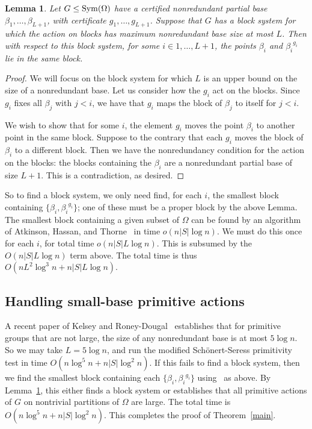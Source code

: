 \documentclass[12pt]{article}
\newcommand{\Sym}{{\rm Sym}}
\newtheorem{lemma}[theorem]{Lemma}
\begin{document}
\begin{lemma}\label{proper block}
  Let $G\leq\Sym(\Omega)$ have
  a certified nonredundant partial base $\beta_1,\ldots,\beta_{L+1}$,
  with certificate $g_1,\ldots,g_{L+1}$.
  Suppose that $G$ has a block system for which the
  action on blocks has maximum nonredundant base size at most $L$.
  Then with respect to this block system,
  for some $i\in 1,\ldots,L+1$, the points $\beta_i$ and
  ${\beta_i}^{g_i}$ lie in the same block.
\end{lemma}
\begin{proof}
  We will focus on the block system for which $L$ is
  an upper bound on the size of a nonredundant base.
  Let us consider how the $g_i$ act on the blocks.
  Since $g_i$ fixes all $\beta_j$ with $j<i$,
  we have that $g_i$ maps the block of $\beta_j$ to itself for $j<i$.

  We wish to show that for some $i$, the element $g_i$ moves the point $\beta_i$ to another point in the
  same block.  Suppose to the contrary that 
  each $g_i$ moves the block of $\beta_i$ to a different block.   Then we have the nonredundancy
  condition for the action on the blocks: the blocks containing
  the $\beta_i$ are a nonredundant partial base of size $L+1$.
  This is a contradiction, as desired.
\end{proof}

So to find a block system, we only need
find, for each $i$, the smallest block
containing $\{\beta_i,{\beta_i}^{g_i}\}$; one of these must
be a proper block by the above Lemma.
The smallest block containing a given subset of $\Omega$
can be found by an algorithm of Atkinson, Hassan, and
Thorne~\cite{atkinson1984group} in time $o(n|S|\log n)$.
We must do this once for each $i$,
for total time $o(n|S|L\log n)$.
This is subsumed by the $O(n|S|L\log n)$ term above.
The total time is thus $O(nL^2\log^3 n+n|S|L\log n)$.

\subsection{Handling small-base primitive actions}
A recent paper of Kelsey and
Roney-Dougal~\cite{Kelsey2022-xi}
establishes that for primitive groups that are not large,
the size of any nonredundant base is at most $5\log n$.  So we may take
$L=5\log n$, and run the modified
Sch\"onert-Seress primitivity test in time
$O(n\log^5 n+n|S|\log^2 n)$.  If this fails to find a block system,
then we
find the smallest block containing each $\{\beta_i,{\beta_i}^{g_i}\}$
using~\cite{atkinson1984group} as above.
By Lemma~\ref{proper block}, this either finds a block system or establishes that
all primitive actions of $G$
on nontrivial partitions of $\Omega$ are large.
The total time is $O(n\log^5 n+n|S|\log^2 n)$.
This completes the proof of Theorem~\ref{main}.
\end{document}
